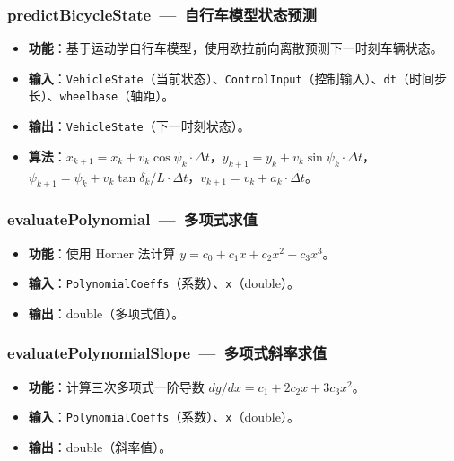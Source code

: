 \documentclass[a4paper,10pt]{article}
\begin{document}
\subsubsection{predictBicycleState~---~自行车模型状态预测}

\begin{itemize}
  \item \textbf{功能}：基于运动学自行车模型，使用欧拉前向离散预测下一时刻车辆状态。
  \item \textbf{输入}：\texttt{VehicleState}（当前状态）、\texttt{ControlInput}（控制输入）、\texttt{dt}（时间步长）、\texttt{wheelbase}（轴距）。
  \item \textbf{输出}：\texttt{VehicleState}（下一时刻状态）。
  \item \textbf{算法}：$x_{k+1} = x_k + v_k \cos\psi_k \cdot \Delta t$，$y_{k+1} = y_k + v_k \sin\psi_k \cdot \Delta t$，$\psi_{k+1} = \psi_k + v_k \tan\delta_k / L \cdot \Delta t$，$v_{k+1} = v_k + a_k \cdot \Delta t$。
\end{itemize}

\subsubsection{evaluatePolynomial~---~多项式求值}

\begin{itemize}
  \item \textbf{功能}：使用 Horner 法计算 $y = c_0 + c_1 x + c_2 x^2 + c_3 x^3$。
  \item \textbf{输入}：\texttt{PolynomialCoeffs}（系数）、\texttt{x}（double）。
  \item \textbf{输出}：double（多项式值）。
\end{itemize}

\subsubsection{evaluatePolynomialSlope~---~多项式斜率求值}

\begin{itemize}
  \item \textbf{功能}：计算三次多项式一阶导数 $dy/dx = c_1 + 2c_2 x + 3c_3 x^2$。
  \item \textbf{输入}：\texttt{PolynomialCoeffs}（系数）、\texttt{x}（double）。
  \item \textbf{输出}：double（斜率值）。
\end{itemize}
\end{document}
